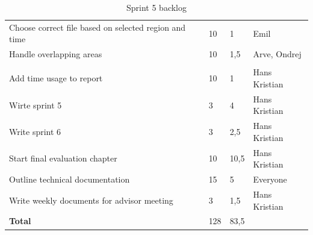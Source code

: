 \documentclass[11pt,a4paper,titlepage,oneside]{report}
\begin{document}
\begin{table}[h]
{\begin{tabular}{llll}
Choose correct file based on selected region and time & 10                                                                  & 1                                                      & Emil          \\
Handle overlapping areas                              & 10                                                                  & 1,5                                                    & Arve, Ondrej  \\
\rowcolor[HTML]{C0C0C0} 
\multicolumn{4}{l}{\cellcolor[HTML]{C0C0C0}\textbf{Reporting}}                                                                                                                                       \\
Add time usage to report                              & 10                                                                  & 1                                                      & Hans Kristian \\
Wirte sprint 5                                        & 3                                                                   & 4                                                      & Hans Kristian \\
Write sprint 6                                        & 3                                                                   & 2,5                                                    & Hans Kristian \\
Start final evaluation chapter                        & 10                                                                  & 10,5                                                   & Hans Kristian \\
Outline technical documentation                       & 15                                                                  & 5                                                      & Everyone      \\
Write weekly documents for advisor meeting            & 3                                                                   & 1,5                                                    & Hans Kristian \\
\rowcolor[HTML]{C0C0C0} 
\textbf{Total}                                        & 128                                                                 & 83,5                                                   &              
\end{tabular}
}
\caption{Sprint 5 backlog}
\label{tab:Sprint5Backlog}
\end{table}
\end{document}
